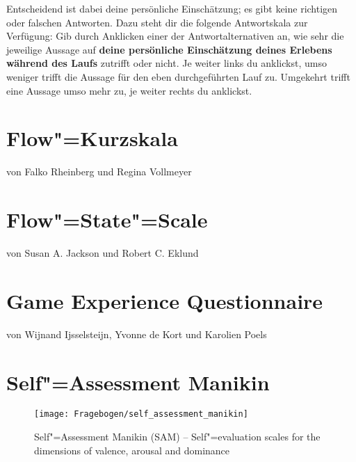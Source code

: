 Entscheidend ist dabei deine persönliche Einschätzung; es gibt keine richtigen oder falschen Antworten. Dazu steht dir die folgende Antwortskala zur Verfügung: Gib durch Anklicken einer der Antwortalternativen an, wie sehr die jeweilige Aussage auf \textbf{deine persönliche Einschätzung deines Erlebens während des Laufs} zutrifft oder nicht. Je weiter links du anklickst, umso weniger trifft die Aussage für den eben durchgeführten Lauf zu. Umgekehrt trifft eine Aussage umso mehr zu, je weiter rechts du anklickst. 
\newpage

\section{Flow"=Kurzskala} 

\label{sec:flow_kurzskala} 

von Falko Rheinberg und Regina Vollmeyer

 

\section{Flow"=State"=Scale} 

\label{sec:flow_state_scale} 

von Susan A. Jackson und Robert C. Eklund 



\section{Game Experience Questionnaire} 

\label{sec:game_experience_questionnaire} 

von Wijnand Ijsselsteijn, Yvonne de Kort und Karolien Poels 



\section{Self"=Assessment Manikin} 

\label{sec:self_assessment_manikin} 
\begin{figure}
	[!htb] \centering 
	\texttt{[image: Fragebogen/self\_assessment\_manikin]} \caption[Self"=Assessment Manikin (SAM)]{Self"=Assessment Manikin (SAM) -- Self"=evaluation scales for the dimensions of valence, arousal and dominance \citep{Bradley1994}} \label{fig:self_assessment_manikin} 
\end{figure}

